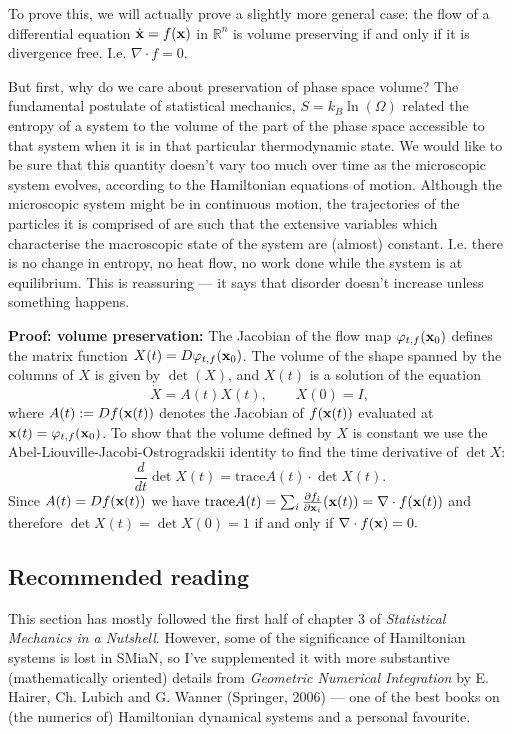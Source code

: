 To prove this, we will actually prove a slightly more general case: the flow of a differential equation $\dot{\bf x}=f({\bf x})$ in $\mathbb{R}^n$ is volume preserving if and only if it is divergence free. I.e. $\nabla\cdot f=0$.

But first, why do we care about preservation of phase space volume? The fundamental postulate of statistical mechanics, $S=k_B\ln(\Omega)$ related the entropy of a system to the volume of the part of the phase space accessible to that system when it is in that particular thermodynamic state. We would like to be sure that this quantity doesn't vary too much over time as the microscopic system evolves, according to the Hamiltonian equations of motion. Although the microscopic system might be in continuous motion, the trajectories of the particles it is comprised of are such that the extensive variables which characterise the macroscopic state of the system are (almost) constant. I.e. there is no change in entropy, no heat flow, no work done while the system is at equilibrium. This is reassuring --- it says that disorder doesn't increase unless something happens.

{\bf Proof: volume preservation:}
The Jacobian of the flow map $\varphi_{t,f}({\bf x}_0)$ defines the matrix function $X(t)=D\varphi_{t,f}({\bf x}_0)$. The volume of the shape spanned by the columns of $X$ is given by $\det(X)$, and $X(t)$ is a solution of the equation
$$
\dot{X}=A(t)X(t),\qquad X(0)=I,
$$
where $A(t):=Df({\bf x}(t))$ denotes the Jacobian of $f({\bf x}(t))$ evaluated at ${\bf x}(t)=\varphi_{t,f}({\bf x}_0)$. To show that the volume defined by $X$ is constant we use  the Abel-Liouville-Jacobi-Ostrogradskii identity to find the time derivative of $\det X$:
$$
\frac{d}{dt}\det X(t)=\text{trace} A(t)\cdot\det X(t).
$$
Since $A(t)=Df({\bf x}(t))$ we have $\text{trace} A(t)=\sum_i\frac{\partial f_i}{\partial {\bf x}_i}({\bf x}(t))=\nabla\cdot f({\bf x}(t))$ and therefore $\det X(t)=\det X(0)=1$ if and only if $\nabla\cdot f({\bf x})=0.$

\subsection{Recommended reading}
This section has mostly followed the first half of chapter 3 of \emph{Statistical Mechanics in a Nutshell}. However, some of the significance of Hamiltonian systems is lost in SMiaN, so I've supplemented it with more substantive (mathematically oriented) details from \emph{Geometric Numerical Integration} by E. Hairer, Ch. Lubich and G. Wanner (Springer, 2006) --- one of the best books on (the numerics of) Hamiltonian dynamical systems and a personal favourite.
